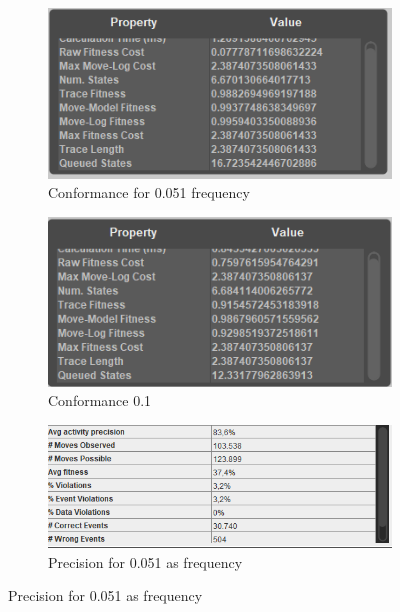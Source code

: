 \begin{figure}[h]
\centering
\begin{subfigure}{.5\textwidth}
  \centering
  \includegraphics[width=\linewidth]{P_Conformance0-051.PNG}
  \caption{Conformance for 0.051 frequency}
  \label{fig:P_Conf0-051}
\end{subfigure}%
\begin{subfigure}{.5\textwidth}
  \centering
  \includegraphics[width=\linewidth]{P_Conformance0-1.PNG}
  \caption{Conformance 0.1}
  \label{fig:P_Conf0-1}
\end{subfigure}
\begin{subfigure}{.49\textwidth}
  \centering
  \includegraphics[width=\linewidth]{P_Precision0-051.PNG}
  \caption{Precision for 0.051 as frequency}
  \label{fig:P_Prec0-051}
\end{subfigure}%

\end{figure}
